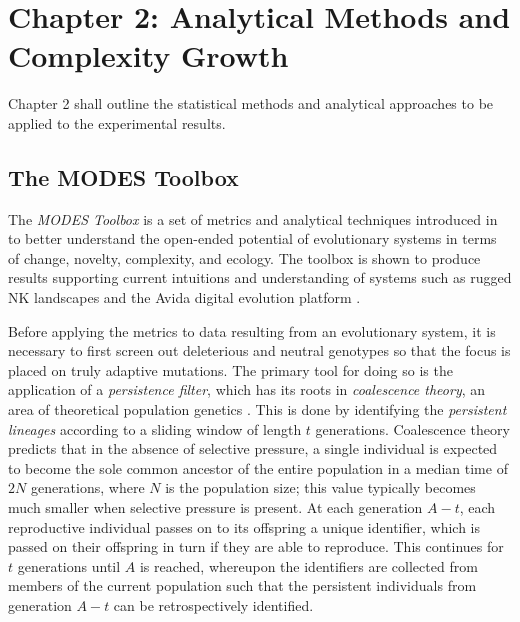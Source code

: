 \documentclass{article}
\begin{document}
\section*{Chapter 2: Analytical Methods and Complexity Growth}
Chapter 2 shall outline the statistical methods and analytical approaches to be applied to the
experimental results.

\subsection*{The MODES Toolbox}
The \textit{MODES Toolbox} is a set of metrics and analytical techniques introduced in 
\cite{dolson2019modes} to better understand the open-ended potential of evolutionary systems in terms
 of change, novelty, complexity, and ecology. The toolbox is shown to produce results supporting
  current intuitions and understanding of systems such as rugged NK landscapes and the Avida 
  digital evolution platform \citep{Lenski2003TheEO, KAUFFMAN198711}. 

Before applying the metrics to data resulting from an evolutionary system, it is necessary to 
first screen out deleterious and neutral genotypes so that the focus is placed on truly adaptive 
mutations. The primary tool for doing so is the application of a \textit{persistence filter}, 
which has its roots in \textit{coalescence theory}, an area of theoretical population genetics 
\citep{Fu1999CoalescingIT}. This is done by identifying the \textit{persistent lineages} 
according to a sliding window of length $t$ generations. Coalescence theory predicts that in the 
absence of selective pressure, a single individual is expected to become the sole common ancestor 
of the entire population in a median time of $2N$ generations, where $N$ is the population size; 
this value typically becomes much smaller when selective pressure is present. At each generation 
$A - t$, each reproductive individual passes on to its offspring a unique identifier, which is 
passed on their offspring in turn if they are able to reproduce. This continues for $t$ 
generations until $A$ is reached, whereupon the identifiers are collected from members of the 
current population such that the persistent individuals from generation $A - t$ can be 
retrospectively identified.
\end{document}
